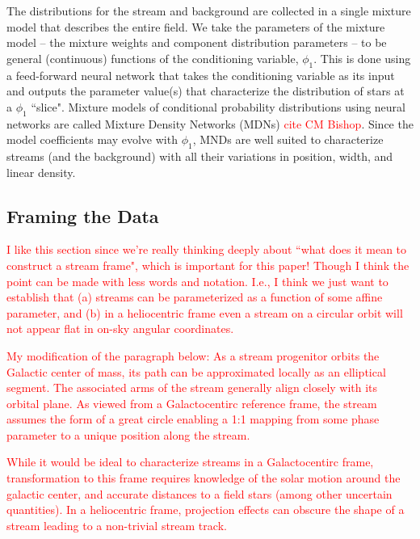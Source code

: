 \documentclass[twocolumn]{aastex631}
\newcommand{\TODO}[1]{{\textcolor{red}{#1}}}
\newcommand{\JN}[1]{\TODO{#1}}
\begin{document}
    The distributions for the stream and background are collected in a single
    mixture model that describes the entire field.  We take the parameters of
    the mixture model -- the mixture weights and component distribution
    parameters -- to be general (continuous) functions of the conditioning
    variable, $\phi_1$. This is done using a feed-forward neural network that
    takes the conditioning variable as its input and outputs the parameter value(s) that characterize the distribution of stars at a $\phi_1$ ``slice".
    Mixture models of conditional probability distributions using neural
    networks are called Mixture Density Networks (MDNs) \JN{cite CM Bishop}. Since the model
    coefficients may evolve with $\phi_1$, MNDs are well suited to characterize
    streams (and the background) with all their variations in position, width,
    and linear density.



    \subsection{Framing the Data} \label{sub:method:framing_the_data}
        \JN{I like this section since we're really thinking deeply about ``what does it mean to construct a stream frame", which is important for this paper! Though I think the point can be made with less words and notation. I.e., I think we just want to establish that (a) streams can be parameterized as a function of some affine parameter, and (b) in a heliocentric frame even a stream on a circular orbit will not appear flat in on-sky angular coordinates. }

        \JN{My modification of the paragraph below:  As a stream progenitor orbits the Galactic center of mass, its path can be approximated locally as an elliptical segment. The associated
        arms of the stream generally align closely with its orbital plane. As viewed from a Galactocentirc reference frame, the stream assumes the form of a great circle enabling a 1:1 mapping from some phase parameter to a unique position along the stream. }

        \JN{
        While it would be ideal to characterize streams in a Galactocentirc frame, transformation to this frame requires knowledge of the solar motion around the galactic center, and accurate distances to a field stars (among other uncertain quantities). In a heliocentric frame, projection effects can obscure the shape of a stream leading to a non-trivial stream track.}  
\end{document}
